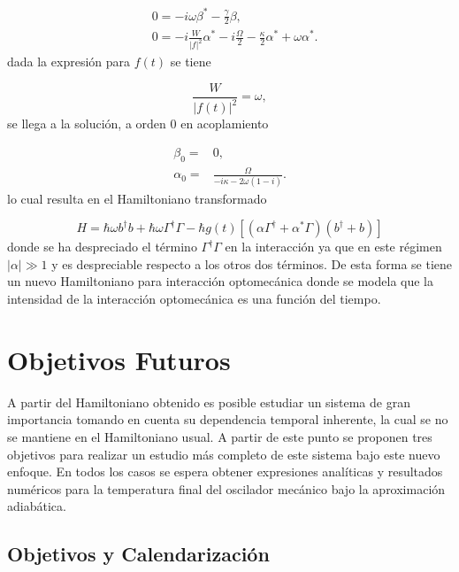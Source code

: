 \documentclass[10pt,a4paper]{report}
\begin{document}
\begin{align}
&0 = -i\omega\beta^* - \frac{\gamma}{2}\beta,\\
&0 = -i \frac{W}{|f|^2}\alpha^* -i \frac{\Omega}{2} - \frac{\kappa}{2}\alpha^* + \omega\alpha^*.
\end{align} dada la expresión para $f(t)$ se tiene

\begin{equation}
\frac{W}{|f(t)|^2} = \omega,
\end{equation} se llega a la solución, a orden 0 en acoplamiento

\begin{align}
\beta_0 =& 0, \\
\alpha_0 =& \frac{\Omega}{-i\kappa - 2\omega(1-i)}.
\end{align} lo cual resulta en el Hamiltoniano transformado

\begin{equation}
H = \hbar \omega b^\dagger b + \hbar\omega \Gamma^\dagger \Gamma -\hbar g(t)[( \alpha \Gamma^{\dagger} + \alpha^* \Gamma)(b^{\dagger}+b)]
\end{equation} donde se ha despreciado el término $\Gamma^{\dagger}\Gamma$ en la interacción ya que en este régimen $|\alpha| \gg 1$ y es despreciable respecto a los otros dos términos. De esta forma se tiene un nuevo Hamiltoniano para interacción optomecánica donde se modela que la intensidad de la interacción optomecánica es una función del tiempo.

\chapter{Objetivos Futuros}


A partir del Hamiltoniano obtenido es posible estudiar un sistema de gran importancia tomando en cuenta su dependencia temporal inherente, la cual se no se mantiene en el Hamiltoniano usual\cite{CavesIF}. A partir de este punto se proponen tres objetivos para realizar un estudio más completo de este sistema bajo este nuevo enfoque. En todos los casos se espera obtener expresiones analíticas y resultados numéricos  para la temperatura final del oscilador mecánico bajo la aproximación adiabática.

\section{Objetivos y Calendarización}
\end{document}
